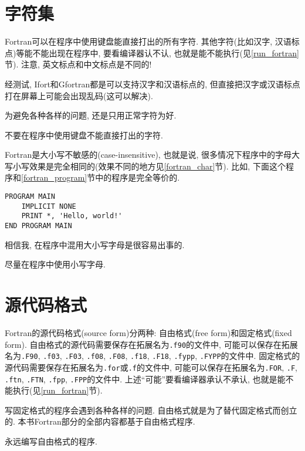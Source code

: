 \section{字符集}

Fortran可以在程序中使用键盘能直接打出的所有字符. 其他字符(比如汉字, 汉语标点)等能不能出现在程序中, 要看编译器认不认, 也就是能不能执行(见\ref{run_fortran}节). 注意, 英文标点和中文标点是不同的!

经测试, Ifort和Gfortran都是可以支持汉字和汉语标点的, 但直接把汉字或汉语标点打在屏幕上可能会出现乱码(这可以解决).

为避免各种各样的问题, 还是只用正常字符为好.

\begin{convention}
    不要在程序中使用键盘不能直接打出的字符.
\end{convention}

Fortran是大小写不敏感的(case-insensitive), 也就是说, 很多情况下程序中的字母大写小写效果是完全相同的(效果不同的地方见\ref{fortran_char}节). 比如, 下面这个程序和\ref{fortran_program}节中的程序是完全等价的.
\begin{lstlisting}
PROGRAM MAIN
    IMPLICIT NONE
    PRINT *, 'Hello, world!'
END PROGRAM MAIN
\end{lstlisting}

相信我, 在程序中混用大小写字母是很容易出事的.

\begin{convention}
    尽量在程序中使用小写字母.
\end{convention}

\section{源代码格式}

Fortran的源代码格式(source form)分两种: 自由格式(free form)和固定格式(fixed form). 自由格式的源代码需要保存在拓展名为\texttt{.f90}的文件中, 可能可以保存在拓展名为\texttt{.F90}, \texttt{.f03}, \texttt{.F03}, \texttt{.f08}, \texttt{.F08}, \texttt{.f18}, \texttt{.F18}, \texttt{.fypp}, \texttt{.FYPP}的文件中. 固定格式的源代码需要保存在拓展名为\texttt{.for}或\texttt{.f}的文件中, 可能可以保存在拓展名为\texttt{.FOR}, \texttt{.F}, \texttt{.ftn}, \texttt{.FTN}, \texttt{.fpp}, \texttt{.FPP}的文件中. 上述``可能''要看编译器承认不承认, 也就是能不能执行(见\ref{run_fortran}节).

写固定格式的程序会遇到各种各样的问题. 自由格式就是为了替代固定格式而创立的. 本书Fortran部分的全部内容都基于自由格式程序.

\begin{convention}
    永远编写自由格式的程序.
\end{convention}


